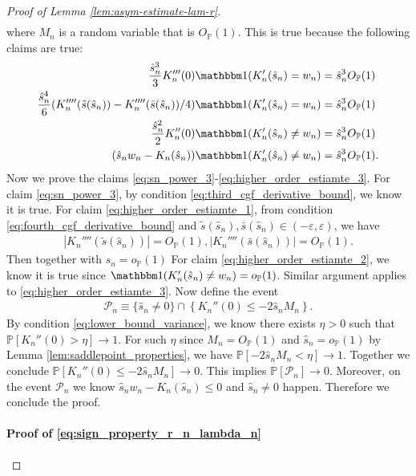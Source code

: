 \documentclass[12pt]{article}
\theoremstyle{definition}
\def\P{\mathbb{P}}
\def\P{\mathbb{P}}
\renewcommand{\P}{\mathbb{P}}							%
\newcommand{\indicator}{\mathbbm 1}						%
\begin{document}
\begin{proof}[Proof of Lemma \ref{lem:asym-estimate-lam-r}]
\begin{align}
	\end{align}
	where $M_n$ is a random variable that is $O_{\P}(1)$. This is true because the following claims are true:
	\begin{align}
		\frac{\hat s_n^3}{3}K_n'''(0)\indicator(K_n'(\hat s_n)=w_n)
		&\label{eq:sn_power_3}
		=\hat s_n^3O_{\P}(1)\\
		\frac{\hat s_n^4}{6}(K_n''''(\tilde s(\hat s_n))-K_n''''(\bar s(\hat s_n))/4)\indicator(K_n'(\hat s_n)=w_n)
		&\label{eq:higher_order_estiamte_1}
		=\hat s_n^3O_{\P}(1)\\
		\frac{\hat s_n^2}{2}K_n''(0)\indicator(K_n'(\hat s_n)\neq w_n)
		&\label{eq:higher_order_estiamte_2}
		=\hat s_n^3O_{\P}(1)\\
		(\hat s_n w_n-K_n(\hat s_n))\indicator(K_n'(\hat s_n)\neq w_n)
		&\label{eq:higher_order_estiamte_3}
		=\hat s_n^3O_{\P}(1).
	\end{align}
	Now we prove the claims \eqref{eq:sn_power_3}-\eqref{eq:higher_order_estiamte_3}. For claim \eqref{eq:sn_power_3}, by condition \eqref{eq:third_cgf_derivative_bound}, we know it is true. For claim \eqref{eq:higher_order_estiamte_1}, from condition \eqref{eq:fourth_cgf_derivative_bound} and $\tilde s(\hat s_n),\bar s(\hat  s_n)\in (-\varepsilon,\varepsilon)$, we have
	\begin{align*}
		\left|K_n''''(\tilde s(\hat s_n))\right|=O_{\P}(1), \left|K_n''''(\bar s(\hat s_n))\right|=O_{\P}(1).
	\end{align*}
	Then together with $\hat s_n=o_{\P}(1)$
	For claim \eqref{eq:higher_order_estiamte_2}, we know it is true since $\indicator(K_n'(\hat s_n)\neq w_n)=o_{\P}(1)$. Similar argument applies to \eqref{eq:higher_order_estiamte_3}. Now define the event
	\begin{align}
		\mathcal{P}_n\equiv \{\hat s_n \neq 0 \}\cap \left\{ K_n''(0)\leq  -2\hat s_nM_n \right\}.
	\end{align}
	By condition \eqref{eq:lower_bound_variance}, we know there exists $\eta>0$ such that $\P[K_n''(0)>\eta]\rightarrow1$. For such $\eta$ since $M_n=O_{\P}(1)$ and $\hat s_n=o_{\P}(1)$ by Lemma \ref{lem:saddlepoint_properties}, we have $\P[-2\hat s_nM_n<\eta]\rightarrow 1$. Together we conclude $\P[K_n''(0)\leq  -2\hat s_nM_n ]\rightarrow0$. This implies $\P[\mathcal{P}_n]\rightarrow0$. Moreover, on the event $\mathcal{P}_n$ we know $\hat s_n w_n -K_n(\hat s_n)\leq 0$ and $\hat s_n\neq 0$ happen. Therefore we conclude the proof.

	\paragraph{Proof of \eqref{eq:sign_property_r_n_lambda_n}}


\end{proof}
\end{document}
